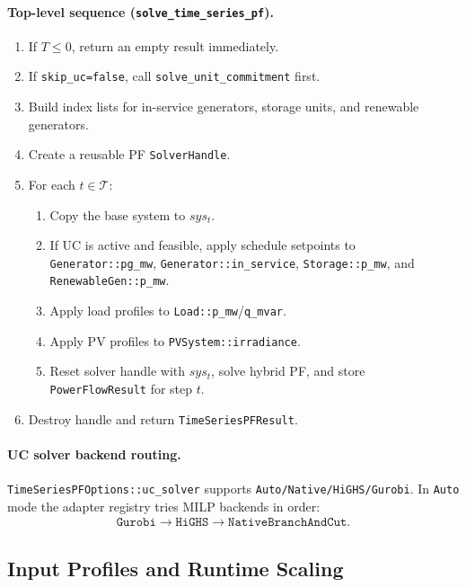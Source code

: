 \paragraph{Top-level sequence (\texttt{solve\_time\_series\_pf}).}
\begin{enumerate}
\item If \(T\le 0\), return an empty result immediately.
\item If \texttt{skip\_uc=false}, call \texttt{solve\_unit\_commitment} first.
\item Build index lists for in-service generators, storage units, and
      renewable generators.
\item Create a reusable PF \texttt{SolverHandle}.
\item For each \(t\in\mathcal{T}\):
  \begin{enumerate}
  \item Copy the base system to \(sys_t\).
  \item If UC is active and feasible, apply schedule setpoints to
        \texttt{Generator::pg\_mw}, \texttt{Generator::in\_service},
        \texttt{Storage::p\_mw}, and \texttt{RenewableGen::p\_mw}.
  \item Apply load profiles to \texttt{Load::p\_mw}/\texttt{q\_mvar}.
  \item Apply PV profiles to \texttt{PVSystem::irradiance}.
  \item Reset solver handle with \(sys_t\), solve hybrid PF, and store
        \texttt{PowerFlowResult} for step \(t\).
  \end{enumerate}
\item Destroy handle and return \texttt{TimeSeriesPFResult}.
\end{enumerate}

\paragraph{UC solver backend routing.}
\texttt{TimeSeriesPFOptions::uc\_solver} supports
\texttt{Auto/Native/HiGHS/Gurobi}.  In \texttt{Auto} mode the adapter registry
tries MILP backends in order:
\begin{align}
\texttt{Gurobi} \rightarrow \texttt{HiGHS} \rightarrow \texttt{NativeBranchAndCut}.
\end{align}

\subsection{Input Profiles and Runtime Scaling}
\label{sec:ts-profiles}

